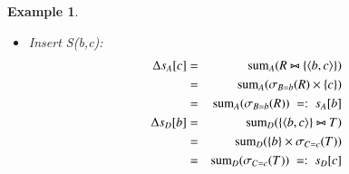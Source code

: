 \documentclass{article}
\newtheorem{example}[theorem]{Example}
\newcommand{\tuple}[1]{{\langle#1\rangle}}
\begin{document}
\begin{example}
\begin{itemize}
Derivation with current rules:
\begin{eqnarray*}
\algnew_{+R(a,b)} s_A[\rho_{B}(R)] &=&
(\algnew_{+R(a,b)} \algsum_{A}(\sigma_{R.B=x}(R)))[x=\algnew_{+R(a,b)} \rho_{B}(R)]
\\
&\stackrel{(\ref{eq:agg2}), (\ref{eq:a5}), (\ref{eq:b6}), (\ref{eq:b1})}{=}& 
(\algincr_{+, s_A[x]}  \algsum_{A}
(\sigma_{R.B=x}(\pi_{a \rightarrow R.A, b \rightarrow R.B}\{<>\})))
[x = \algnew_{+R(a,b)} \rho_{B}(R)]
\\
&\stackrel{(\ref{eq:md4}), (\ref{eq:fs2}), (\ref{eq:ags1})^*, (\ref{eq:ags2})^*}{=}&
\algfor(x \in B) \; \{ \; \mathrm{ignore}((\algupdate_{+, s_{A}[x]}
\algsum_{A}
(\sigma_{R.B=x}(\pi_{a \rightarrow R.A, b \rightarrow R.B}\{<>\})))[x]) \; \};
\\
&& rc = b;
\\
&& (\alginsert_{s_{A}[rc]} a)[rc]
\\
&=&
\mbox{if ($s_A$.find($b$) != $s_A$.end)} \; \{ \; \algupdate_{+,s_A[b]} a \; \}
\\
&& \mbox{else } \; \{ \; \alginsert_{s_A[b]} a \; \}
\\
&\dots& \mbox{Note the for loop is only valid when $x = b$}
%
%
\\[2ex]
\algnew_{+R(a,b)} s_A[\rho_{C}(S)] &=&
(\algnew_{+R(a,b)} \algsum_A (R \times \sigma_{S.C=x}(S)))[x = \algnew_{+R(a,b)} \rho_{C}(S)]
\\
&\stackrel{(\ref{eq:md4}), (\ref{eq:agg2}), (\ref{eq:a5}), (\ref{eq:b6}), (\ref{eq:b1})}
{\stackrel{(\ref{eq:ags1}), (\ref{eq:ags2}), (\ref{eq:sum3})}{=}}&
\algfor(x \in C) \; \\
&& \qquad \mathrm{ignore}((\algupdate_{+, s_{A}[x]}
a * \algsum_{1}
(\sigma_{S.C=x}(S)))[x]);\\
&\dots& \mbox{Note $rc = null$, thus no return value.}
\end{eqnarray*}

(Analogously insert T(c,d) for maintaining $s_{D}[b], s_{D}[c]$.)

\item
Insert S(b,c):
\begin{eqnarray*}
\Delta s_A[c] &=&
\algsum_{A}(R \bowtie \{\tuple{b,c}\})
\\ &=&
\algsum_{A}(\sigma_{B=b}(R) \times \{c\})
\\ &=&
\algsum_{A}(\sigma_{B=b}(R))
\;=:\; s_A[b]
\\
\Delta s_D[b] &=&
\algsum_{D}(\{\tuple{b,c}\} \bowtie T)
\\ &=&
\algsum_{D}(\{b\} \times \sigma_{C=c}(T))
\\ &=&
\algsum_{D}(\sigma_{C=c}(T))
\;=:\; s_D[c]
\end{eqnarray*}
\end{itemize}


\end{example}
\end{document}
